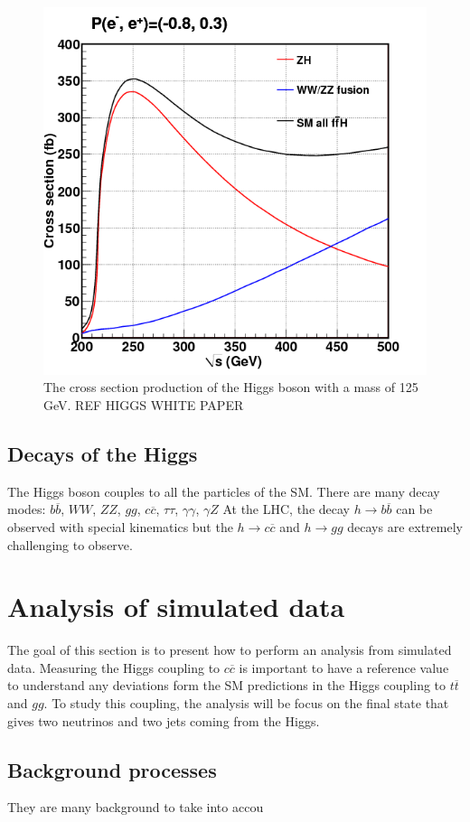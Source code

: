   \begin{figure}
    \centering
    \includegraphics[width = 10 cm]{Pictures/Higgs/higgs_xsec_P-8_3.png}
    \caption{The cross section production of the Higgs boson with a mass of 125 GeV. REF HIGGS WHITE PAPER}
    \label{fig:higgsXsec}
  \end{figure}

  \subsection{Decays of the Higgs}

  The Higgs boson couples to all the particles of the SM.
  There are many decay modes: $b\overline{b}$, $WW$, $ZZ$, $gg$, $c\overline{c}$, $\tau \tau$, $\gamma \gamma$, $\gamma Z$
  At the LHC, the decay $h \rightarrow b\overline{b}$ can be observed with special kinematics but the $h \rightarrow c \overline{c}$ and $h \rightarrow gg$ decays are extremely challenging to observe.


  \section{Analysis of simulated data}
  
  The goal of this section is to present how to perform an analysis from simulated data. 
  Measuring the Higgs coupling to $c\overline{c}$ is important to have a reference value to understand any deviations form the SM predictions in the Higgs coupling to $t\overline{t}$ and $gg$.
  To study this coupling, the analysis will be focus on the final state that gives two neutrinos and two jets coming from the Higgs.
  
  \subsection{Background processes}

  They are many background to take into accou   
